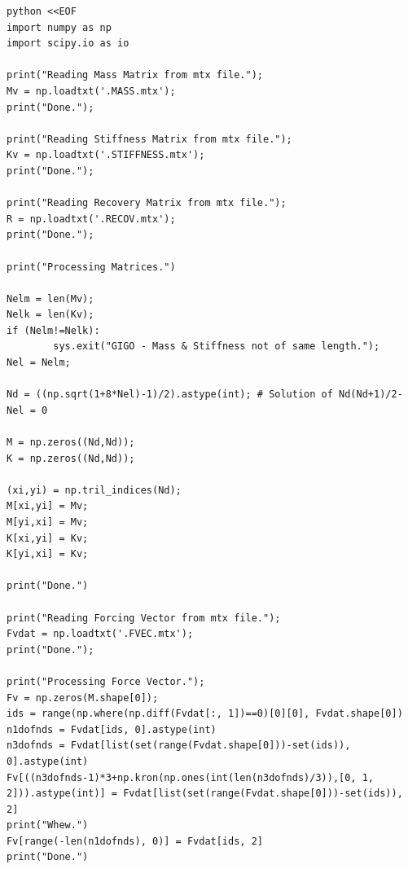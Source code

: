 \documentclass[11pt]{article}
\begin{document}
\begin{enumerate}
\begin{verbatim}
python <<EOF
import numpy as np
import scipy.io as io

print("Reading Mass Matrix from mtx file.");
Mv = np.loadtxt('.MASS.mtx');
print("Done.");

print("Reading Stiffness Matrix from mtx file.");
Kv = np.loadtxt('.STIFFNESS.mtx');
print("Done.");

print("Reading Recovery Matrix from mtx file.");
R = np.loadtxt('.RECOV.mtx');
print("Done.");

print("Processing Matrices.")

Nelm = len(Mv);
Nelk = len(Kv);
if (Nelm!=Nelk):
        sys.exit("GIGO - Mass & Stiffness not of same length.");
Nel = Nelm;

Nd = ((np.sqrt(1+8*Nel)-1)/2).astype(int); # Solution of Nd(Nd+1)/2-Nel = 0

M = np.zeros((Nd,Nd));
K = np.zeros((Nd,Nd));

(xi,yi) = np.tril_indices(Nd);
M[xi,yi] = Mv;
M[yi,xi] = Mv;
K[xi,yi] = Kv;
K[yi,xi] = Kv;

print("Done.")

print("Reading Forcing Vector from mtx file.");
Fvdat = np.loadtxt('.FVEC.mtx');
print("Done.");

print("Processing Force Vector.");
Fv = np.zeros(M.shape[0]);
ids = range(np.where(np.diff(Fvdat[:, 1])==0)[0][0], Fvdat.shape[0])
n1dofnds = Fvdat[ids, 0].astype(int)
n3dofnds = Fvdat[list(set(range(Fvdat.shape[0]))-set(ids)), 0].astype(int)
Fv[((n3dofnds-1)*3+np.kron(np.ones(int(len(n3dofnds)/3)),[0, 1, 2])).astype(int)] = Fvdat[list(set(range(Fvdat.shape[0]))-set(ids)), 2]
print("Whew.")
Fv[range(-len(n1dofnds), 0)] = Fvdat[ids, 2]
print("Done.")


\end{verbatim}
\end{enumerate}
\end{document}
